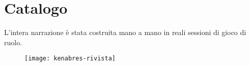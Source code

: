 {}
\chapter*{Catalogo}
\begingroup 
    \let\clearpage\relax
    \let\cleardoublepage\relax
    \let\cleardoublepage\relax
\pagestyle{scrheadings} 

L'intera narrazione \`e stata costruita mano a mano in reali sessioni di gioco di ruolo.

\begin{figure}[ht]
    \texttt{[image: kenabres-rivista]}
\end{figure}

\endgroup 